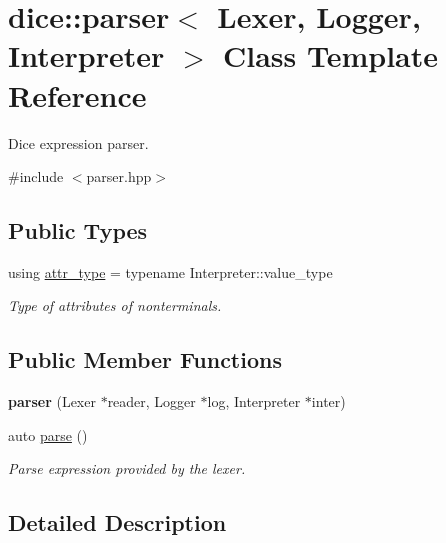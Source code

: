 \hypertarget{classdice_1_1parser}{}\section{dice\+:\+:parser$<$ Lexer, Logger, Interpreter $>$ Class Template Reference}
\label{classdice_1_1parser}


Dice expression parser.  




{\ttfamily \#include $<$parser.\+hpp$>$}

\subsection*{Public Types}
\begin{DoxyCompactItemize}
\item 
\mbox{\label{classdice_1_1parser_ad550d010318819123ef5a028322df8eb}} 
using \mbox{\hyperlink{classdice_1_1parser_ad550d010318819123ef5a028322df8eb}{attr\+\_\+type}} = typename Interpreter\+::value\+\_\+type
\begin{DoxyCompactList}\small\item\em Type of attributes of nonterminals. \end{DoxyCompactList}\end{DoxyCompactItemize}
\subsection*{Public Member Functions}
\begin{DoxyCompactItemize}
\item 
\mbox{\label{classdice_1_1parser_a09510972db249f96cc49f1bb60cde597}} 
{\bfseries parser} (Lexer $\ast$reader, Logger $\ast$log, Interpreter $\ast$inter)
\item 
auto \mbox{\hyperlink{classdice_1_1parser_a9166865af1db0974b2b372885bcc1501}{parse}} ()
\begin{DoxyCompactList}\small\item\em Parse expression provided by the lexer. \end{DoxyCompactList}\end{DoxyCompactItemize}


\subsection{Detailed Description}
